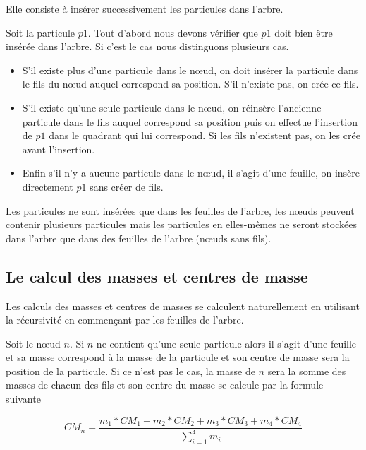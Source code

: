 Elle consiste à insérer successivement les particules dans l'arbre.

Soit la particule $p1$. Tout d'abord nous devons vérifier que $p1$ doit bien être insérée dans l'arbre.
Si c'est le cas nous distinguons plusieurs cas. 
\begin{itemize}

\item S'il existe plus d'une particule dans le nœud, on doit insérer la particule dans le fils du nœud auquel correspond sa position. S'il n'existe pas, on crée ce fils.


\item S'il existe qu'une seule particule dans le nœud, on réinsère l'ancienne particule dans le fils auquel correspond sa position puis on effectue l'insertion de $p1$ dans le quadrant qui lui correspond. Si les fils n'existent pas, on les crée avant l'insertion. 

\item Enfin s'il n'y a aucune particule dans le nœud, il s'agit  d'une feuille, on insère directement $p1$ sans créer de fils.

\end{itemize}

Les particules ne sont insérées que dans les feuilles de l'arbre, les nœuds peuvent contenir plusieurs particules mais les particules en elles-mêmes ne seront stockées dans l'arbre que dans des feuilles de l'arbre (nœuds sans fils).

\subsection{Le calcul des masses et centres de masse}

Les calculs des masses et centres de masses se calculent naturellement en utilisant la récursivité en commençant par les feuilles de l'arbre.

\vspace{2mm}
Soit le nœud $n$. 
Si $n$ ne contient qu'une seule particule alors il s'agit d'une feuille et sa masse correspond à la masse de la particule et son centre de masse sera la position de la particule. Si ce n'est pas le cas, la masse de $n$ sera la somme des masses de chacun des fils et son centre du masse se calcule par la formule suivante

\begin{equation}
    CM_n = \frac{m_1*CM_1 + m_2*CM_2+ m_3*CM_3 + m_4*CM_4 }{\sum_{i=1}^{4}{m_i}}
\end{equation}

